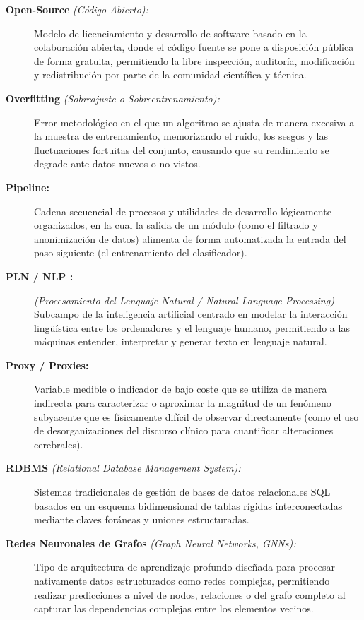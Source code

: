 \documentclass[12pt,a4paper,onecolumn,oneside]{report}
\begin{document}
\begin{description}
    \item[\textbf{Open-Source} \textit{(Código Abierto):}] Modelo de licenciamiento y desarrollo de software basado en la colaboración abierta, donde el código fuente se pone a disposición pública de forma gratuita, permitiendo la libre inspección, auditoría, modificación y redistribución por parte de la comunidad científica y técnica.
    
    \item[\textbf{Overfitting} \textit{(Sobreajuste o Sobreentrenamiento):}] Error metodológico en el que un algoritmo se ajusta de manera excesiva a la muestra de entrenamiento, memorizando el ruido, los sesgos y las fluctuaciones fortuitas del conjunto, causando que su rendimiento se degrade ante datos nuevos o no vistos.
    
    \item[\textbf{Pipeline:}] Cadena secuencial de procesos y utilidades de desarrollo lógicamente organizados, en la cual la salida de un módulo (como el filtrado y anonimización de datos) alimenta de forma automatizada la entrada del paso siguiente (el entrenamiento del clasificador).
    
    \item[\textbf{PLN / NLP :}] \textit{(Procesamiento del Lenguaje Natural / Natural Language Processing)}  Subcampo de la inteligencia artificial centrado en modelar la interacción lingüística entre los ordenadores y el lenguaje humano, permitiendo a las máquinas entender, interpretar y generar texto en lenguaje natural.
    
    \item[\textbf{Proxy / Proxies:}] Variable medible o indicador de bajo coste que se utiliza de manera indirecta para caracterizar o aproximar la magnitud de un fenómeno subyacente que es físicamente difícil de observar directamente (como el uso de desorganizaciones del discurso clínico para cuantificar alteraciones cerebrales).
    
    \item[\textbf{RDBMS} \textit{(Relational Database Management System):}] Sistemas tradicionales de gestión de bases de datos relacionales SQL basados en un esquema bidimensional de tablas rígidas interconectadas mediante claves foráneas y uniones estructuradas.
    
    \item[\textbf{Redes Neuronales de Grafos} \textit{(Graph Neural Networks, GNNs):}] Tipo de arquitectura de aprendizaje profundo diseñada para procesar nativamente datos estructurados como redes complejas, permitiendo realizar predicciones a nivel de nodos, relaciones o del grafo completo al capturar las dependencias complejas entre los elementos vecinos.
    

\end{description}
\end{document}
